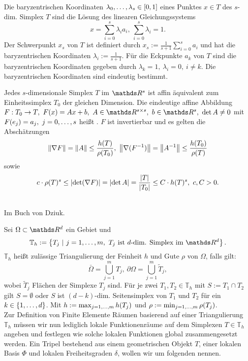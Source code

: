 Die baryzentrischen Koordinaten $\lambda_0, \dots ,\lambda_s\in [0,1]$ eines Punktes $x\in T$ des $s$-dim. Simplex $T$ sind die Lösung des linearen Gleichungssystems
\[
x= \sum_{i=0}^{s}\lambda_i a_i,~ \sum_{i=0}^{s} \lambda_i =1.
\]
Der Schwerpunkt $x_s$ von $T$ ist definiert durch $x_s := \frac{1}{s+1}\sum_{i=0}^{s}a_i$ und hat die baryzentrischen Koordinaten $\lambda_i :=\frac{1}{s+1}$.
Für die Eckpunkte $a_k$ von $T$ sind die baryzentrischen Koordinaten gegeben durch $\lambda_k=1,~\lambda_i =0,~i\neq k$.
Die baryzentrischen Koordinaten sind eindeutig bestimmt.

Jedes $s$-dimensionale Simplex $T$ im $\R^s$ ist affin äquivalent zum Einheitssimplex $T_0$ der gleichen Dimension.
Die eindeutige affine Abbildung $F:T_0\to T, ~ F(x) =Ax+b,~A\in \R^{s\times s},~b\in \R^s, ~\det A \neq 0$ mit $F(e_j)= a_j,~j=0, \dots ,
s$ heißt .
$F$ ist invertierbar und es gelten die Abschätzungen
\[
\left\Vert\nabla F\right\Vert = \left\Vert A\right\Vert\le \frac{h(T)}{\rho(T_0)},~\left\Vert\nabla(F^{-1})\right\Vert= \left\Vert A^{-1}\right\Vert\le \frac{h(T_0)}{\rho(T)}
\]
sowie
\[
c\cdot \rho(T)^s \le \left\vert\det (\nabla F)\right\vert= \left\vert\det A\right\vert =\frac{\left\vert T\right\vert}{\left\vert T_0\right\vert}\le C\cdot h(T)^s,~c,C>0.
\]

\\
Im Buch von Dziuk.

Sei $\Omega\subset\R^d$ ein Gebiet und 
\[
\mathbb{T}_h := \penbrace{T_j~|~j=1\dt{,}m,~T_j\text{ ist $d$-dim. Simplex im }\R^d}.
\]
$\mathbb{T}_h$ heißt zulässige Triangulierung der Feinheit $h$ und Gute $\rho$ von $\Omega$, falls gilt:
\[
\bar{\Omega} = \bigcup\limits_{j=1}^{m} T_j,~\partial\Omega = \bigcup\limits_{j=1}^{m} \tilde{T}_j,
\]
wobei $\tilde{T}_j$ Flächen der Simplexe $T_j$ sind.
Für je zwei $T_1,T_2\in \mathbb{T}_h$ mit $S:=T_1\cap T_2$ gilt $S=\emptyset$ oder $S$ ist $(d-k)$-dim. Seitensimplex von $T_1$ und $T_2$ für ein $k\in \{1, \dots ,d\}$.
Mit $h:=\max_{j=1, \dots ,m}h(T_j)$ und $\rho := \min_{j=1, \dots ,m}\rho(T_j)$.\\

Zur Definition von Finite Elemente Räumen basierend auf einer Triangulierung $\mathbb{T}_h$ müssen wir nun lediglich lokale Funktionenräume auf dem Simplexen $T\in\mathbb{T}_h$ angeben und festlegen wie solche lokalen Funktionen global zusammengesetzt werden.
Ein Tripel bestehend aus einem geometrischen Objekt $T$, einer lokalen Basis $\Phi$ und lokalen Freiheitsgraden $\delta$, wollen wir um folgenden  nennen.

